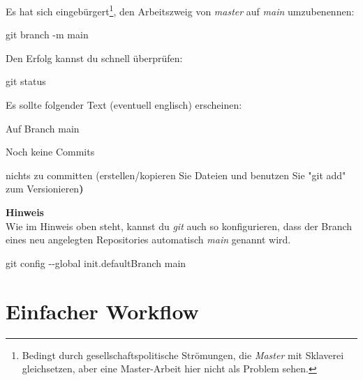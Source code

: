 \documentclass[
  ngerman,
  letterpaper,
  DIV=11]{scrreprt}
\newenvironment{Shaded}{\begin{snugshade}}{\end{snugshade}}
\newcommand{\AttributeTok}[1]{\textcolor[rgb]{0.40,0.45,0.13}{#1}}
\newcommand{\ErrorTok}[1]{\textcolor[rgb]{0.68,0.00,0.00}{#1}}
\newcommand{\ExtensionTok}[1]{\textcolor[rgb]{0.00,0.23,0.31}{#1}}
\newcommand{\FunctionTok}[1]{\textcolor[rgb]{0.28,0.35,0.67}{#1}}
\newcommand{\KeywordTok}[1]{\textcolor[rgb]{0.00,0.23,0.31}{\textbf{#1}}}
\newcommand{\NormalTok}[1]{\textcolor[rgb]{0.00,0.23,0.31}{#1}}
\newcommand{\StringTok}[1]{\textcolor[rgb]{0.13,0.47,0.30}{#1}}
\newcommand{\git}{\textit{git}\xspace}
\begin{document}
Es hat sich eingebürgert\footnote{Bedingt durch gesellschaftspolitische
  Strömungen, die \emph{Master} mit Sklaverei gleichsetzen, aber eine
  Master-Arbeit hier nicht als Problem sehen.}, den Arbeitszweig von
\emph{master} auf \emph{main} umzubenennen:

\begin{Shaded}
\begin{Highlighting}[]
\FunctionTok{git}\NormalTok{ branch }\AttributeTok{{-}m}\NormalTok{ main }
\end{Highlighting}
\end{Shaded}

Den Erfolg kannst du schnell überprüfen:

\begin{Shaded}
\begin{Highlighting}[]
\FunctionTok{git}\NormalTok{ status}
\end{Highlighting}
\end{Shaded}

Es sollte folgender Text (eventuell englisch) erscheinen:

\begin{Shaded}
\begin{Highlighting}[]
\ExtensionTok{Auf}\NormalTok{ Branch main}

\ExtensionTok{Noch}\NormalTok{ keine Commits}

\ExtensionTok{nichts}\NormalTok{ zu committen }\ErrorTok{(}\ExtensionTok{erstellen/kopieren}\NormalTok{ Sie Dateien und benutzen}
\ExtensionTok{Sie} \StringTok{"git add"}\NormalTok{ zum Versionieren}\KeywordTok{)}
\end{Highlighting}
\end{Shaded}

\samplestart

\textbf{Hinweis}\\
Wie im Hinweis oben steht, kannst du \git auch so konfigurieren, dass
der Branch eines neu angelegten Repositories automatisch \emph{main}
genannt wird.

\begin{Shaded}
\begin{Highlighting}[]
\FunctionTok{git}\NormalTok{ config }\AttributeTok{{-}{-}global}\NormalTok{ init.defaultBranch main}
\end{Highlighting}
\end{Shaded}

\sampleend

\section{Einfacher Workflow}\label{einfacher-workflow}
\end{document}
